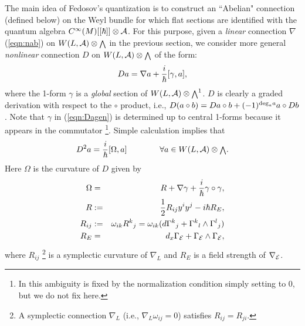 \documentclass[10pt,a4paper]{article}
\def\h{\hbar}
\begin{document}
The main idea of Fedosov's quantization is to construct an ``Abelian" connection (defined below) on the Weyl bundle for which flat sections are identified with the quantum algebra $C^\infty(M)[[\h]]\otimes {\cal A}$. 
For this purpose, given a {\it linear} connection $\nabla$ (\ref{eqn:nab}) on $W(L,{\cal A})\otimes {\scriptstyle \bigwedge}$ in the previous section, we consider more general {\it nonlinear} connection $D$ on $W(L,{\cal A})\otimes {\scriptstyle \bigwedge}$ of the form:
\begin{equation}
\label{eqn:Dagen}
Da=\nabla a+{i\over\h}[\gamma,a],
\end{equation}
where the 1-form $\gamma$ is a {\it global} section of $W(L,{\cal A})\otimes {\scriptstyle \bigwedge}^1$. $D$ is clearly a graded derivation with respect to the $\circ$ product, i.e., $D(a\circ b)=Da\circ b+(-1)^{{\rm deg}_a a}a\circ Db$. Note that $\gamma$ in (\ref{eqn:Dagen}) is determined up to central 1-forms because it appears in the commutator
\footnote{In \cite{Fed}\cite{Fedbk} this ambiguity is fixed by the normalization condition simply setting to $0$, but we do not fix here.
}.
Simple calculation implies that
\begin{equation}
D^2a={i\over\h}[\Omega,a] \qquad \qquad  \forall a\in W(L,{\cal A})\otimes {\scriptstyle \bigwedge} .
\end{equation}
Here $\Omega$ is the curvature of $D$ given by
\begin{eqnarray}
\Omega&=&R+\nabla\gamma+{i\over\h}\gamma\circ \gamma,\nonumber\\
R&:=&{1\over2}R_{ij}y^iy^j-i\hbar R_E,\nonumber\\
R_{ij}&:=&\omega_{ik}{R^k}_j=\omega_{ik}(d{\Gamma^k}_j+{\Gamma^k}_l\wedge{\Gamma^l}_j)\nonumber\\
R_E&=&d_x\Gamma_{\cal E}+\Gamma_{\cal E}\wedge\Gamma_{\cal E},
\end{eqnarray}
where $R_{ij}$
\footnote{
        A symplectic connection $\nabla_L$ (i.e., $\nabla_L\omega_{ij}=0$) satisfies $R_{ij}=R_{ji}$.
}
 is a symplectic curvature of $\nabla_L$ and $R_E$ is a field strength of $\nabla_{\cal E}$.\\
\end{document}
